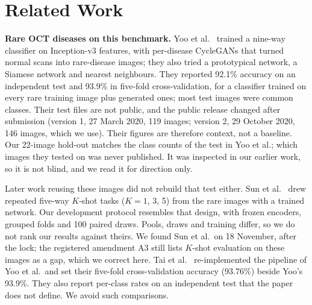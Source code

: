 \documentclass[conference]{IEEEtran}
\begin{document}
\section{Related Work}
\label{sec:related}
\textbf{Rare OCT diseases on this benchmark.} Yoo et al.\ \cite{Yoo2021} trained a nine-way classifier on Inception-v3 features, with per-disease CycleGANs that turned normal scans into rare-disease images; they also tried a prototypical network, a Siamese network and nearest neighbours. They reported 92.1\% accuracy on an independent test and 93.9\% in five-fold cross-validation, for a classifier trained on every rare training image plus generated ones; most test images were common classes. Their test files are not public, and the public release changed after submission (version 1, 27 March 2020, 119 images; version 2, 29 October 2020, 146 images, which we use). Their figures are therefore context, not a baseline.
Our 22-image hold-out matches the class counts of the test in Yoo et al.; which images they tested on was never published. It was inspected in our earlier work, so it is not blind, and we read it for direction only.

Later work reusing these images did not rebuild that test either. Sun et al.\ \cite{Sun2024} drew repeated five-way $K$-shot tasks ($K=1$, 3, 5) from the rare images with a trained network. Our development protocol resembles that design, with frozen encoders, grouped folds and 100 paired draws. Pools, draws and training differ, so we do not rank our results against theirs. We found Sun et al.\ on 18 November, after the lock; the registered amendment A3 still lists $K$-shot evaluation on these images as a gap, which we correct here.
Tai et al.\ \cite{Tai2025} re-implemented the pipeline of Yoo et al.\ and set their five-fold cross-validation accuracy (93.76\%) beside Yoo's 93.9\%. They also report per-class rates on an independent test that the paper does not define. We avoid such comparisons.
\end{document}
